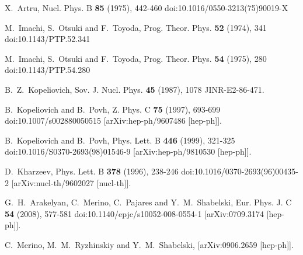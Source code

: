 \begin{thebibliography}{99}
X.~Artru,
Nucl. Phys. B \textbf{85} (1975), 442-460
doi:10.1016/0550-3213(75)90019-X

M.~Imachi, S.~Otsuki and F.~Toyoda,
Prog. Theor. Phys. \textbf{52} (1974), 341
doi:10.1143/PTP.52.341

M.~Imachi, S.~Otsuki and F.~Toyoda,
Prog. Theor. Phys. \textbf{54} (1975), 280
doi:10.1143/PTP.54.280

B.~Z.~Kopeliovich,
Sov. J. Nucl. Phys. \textbf{45} (1987), 1078
JINR-E2-86-471.

B.~Kopeliovich and B.~Povh,
Z. Phys. C \textbf{75} (1997), 693-699
doi:10.1007/s002880050515
[arXiv:hep-ph/9607486 [hep-ph]].

B.~Kopeliovich and B.~Povh,
Phys. Lett. B \textbf{446} (1999), 321-325
doi:10.1016/S0370-2693(98)01546-9
[arXiv:hep-ph/9810530 [hep-ph]].

D.~Kharzeev,
Phys. Lett. B \textbf{378} (1996), 238-246
doi:10.1016/0370-2693(96)00435-2
[arXiv:nucl-th/9602027 [nucl-th]].

G.~H.~Arakelyan, C.~Merino, C.~Pajares and Y.~M.~Shabelski,
Eur. Phys. J. C \textbf{54} (2008), 577-581
doi:10.1140/epjc/s10052-008-0554-1
[arXiv:0709.3174 [hep-ph]].

C.~Merino, M.~M.~Ryzhinskiy and Y.~M.~Shabelski,
[arXiv:0906.2659 [hep-ph]].


\end{thebibliography}
